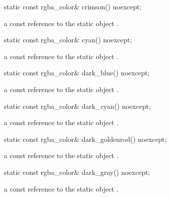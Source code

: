 \begin{itemdecl}
static const rgba_color& crimson() noexcept;
\end{itemdecl}
\begin{itemdescr}
\pnum
\returns
a const reference to the static  object .
\end{itemdescr}

\begin{itemdecl}
static const rgba_color& cyan() noexcept;
\end{itemdecl}
\begin{itemdescr}
\pnum
\returns
a const reference to the static  object .
\end{itemdescr}

\begin{itemdecl}
static const rgba_color& dark_blue() noexcept;
\end{itemdecl}
\begin{itemdescr}
\pnum
\returns
a const reference to the static  object .
\end{itemdescr}

\begin{itemdecl}
static const rgba_color& dark_cyan() noexcept;
\end{itemdecl}
\begin{itemdescr}
\pnum
\returns
a const reference to the static  object .
\end{itemdescr}

\begin{itemdecl}
static const rgba_color& dark_goldenrod() noexcept;
\end{itemdecl}
\begin{itemdescr}
\pnum
\returns
a const reference to the static  object .
\end{itemdescr}

\begin{itemdecl}
static const rgba_color& dark_gray() noexcept;
\end{itemdecl}
\begin{itemdescr}
\pnum
\returns
a const reference to the static  object .
\end{itemdescr}


